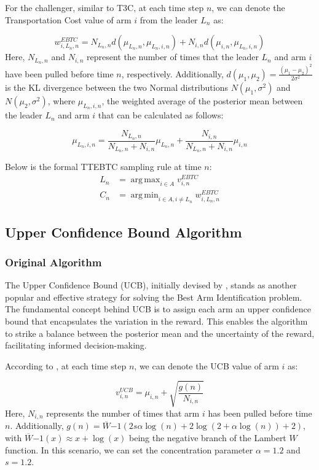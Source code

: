 \documentclass[a4paper, 12pt]{article}
\DeclareMathOperator{\argmax}{arg\,max}
\DeclareMathOperator{\argmin}{arg\,min}
\theoremstyle{definition}
\begin{document}
For the challenger, similar to T3C, at each time step $n$, we can denote the Transportation Cost value of arm $i$ from the leader $L_n$ as:

\[
w_{i,L_n,n}^{EBTC} = N_{L_n,n} d(\mu_{L_n,n},\mu_{L_n,i,n})+ N_{i,n} d(\mu_{i,n},\mu_{L_n,i,n})     
\]
Here, $N_{L_n,n}$ and $N_{i,n}$ represent the number of times that the leader $L_n$ and arm $i$ have been pulled before time $n$, respectively. Additionally, $d(\mu_1,\mu_2) = \frac{(\mu_1 - \mu_2)^2}{2\sigma^2}$ is the KL divergence between the two Normal distributions $N(\mu_1,\sigma^2)$ and $N(\mu_2,\sigma^2)$, where $\mu_{L_n,i,n}$, the weighted average of the posterior mean between the leader $L_n$ and arm $i$ that can be calculated as follows:

\[
\mu_{L_n,i,n} = \frac{N_{L_n,n}}{N_{L_n,n}+N_{i,n}} \mu_{L_n,n} + \frac{N_{i,n}}{N_{L_n,n}+N_{i,n}} \mu_{i,n}  
\]

Below is the formal TTEBTC sampling rule at time $n$:
\begin{align} \label{eq:ttebtc}
L_n & = \argmax_{i\in A} v_{i,n}^{EBTC} \nonumber \\
C_n & = \argmin_{i\in A,i\neq L_n} w_{i,L_n,n}^{EBTC}
\end{align}


\subsection{Upper Confidence Bound Algorithm}
\subsubsection{Original Algorithm}
The Upper Confidence Bound (UCB), initially devised by \cite{ucb}, stands as another popular and effective strategy for solving the Best Arm Identification problem. The fundamental concept behind UCB is to assign each arm an upper confidence bound that encapsulates the variation in the reward. This enables the algorithm to strike a balance between the posterior mean and the uncertainty of the reward, facilitating informed decision-making.

According to \cite{ttucb}, at each time step $n$, we can denote the UCB value of arm $i$ as:

\[
v_{i,n}^{UCB} = \mu_{i,n} + \sqrt{\frac{g(n)}{N_{i,n}}}     
\]
Here, $N_{i,n}$ represents the number of times that arm $i$ has been pulled before time $n$. Additionally, $g(n) = \overline{W}{-1}(2s\alpha \log(n) + 2\log(2+\alpha \log(n)) +2)$, with $\overline{W}{-1}(x) \approx x + \log(x)$ being the negative branch of the Lambert $W$ function. In this scenario, we can set the concentration parameter $\alpha=1.2$ and $s=1.2$.
\end{document}
